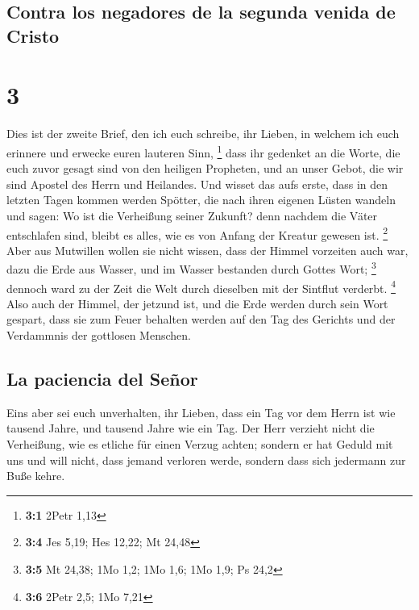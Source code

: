 \hypertarget{contra-los-negadores-de-la-segunda-venida-de-cristo}{%
\subsection{Contra los negadores de la segunda venida de
Cristo}\label{contra-los-negadores-de-la-segunda-venida-de-cristo}}

\hypertarget{section-2}{%
\section{3}\label{section-2}}

 Dies ist der zweite Brief, den ich euch schreibe, ihr
Lieben, in welchem ich euch erinnere und erwecke euren lauteren Sinn,
\footnote{\textbf{3:1} 2Petr 1,13}  dass ihr gedenket an
die Worte, die euch zuvor gesagt sind von den heiligen Propheten, und an
unser Gebot, die wir sind Apostel des Herrn und Heilandes.
 Und wisset das aufs erste, dass in den letzten Tagen
kommen werden Spötter, die nach ihren eigenen Lüsten wandeln
 und sagen: Wo ist die Verheißung seiner Zukunft? denn
nachdem die Väter entschlafen sind, bleibt es alles, wie es von Anfang
der Kreatur gewesen ist. \footnote{\textbf{3:4} Jes 5,19; Hes 12,22; Mt
  24,48}  Aber aus Mutwillen wollen sie nicht wissen, dass
der Himmel vorzeiten auch war, dazu die Erde aus Wasser, und im Wasser
bestanden durch Gottes Wort; \footnote{\textbf{3:5} Mt 24,38; 1Mo 1,2;
  1Mo 1,6; 1Mo 1,9; Ps 24,2}  dennoch ward zu der Zeit die
Welt durch dieselben mit der Sintflut verderbt. \footnote{\textbf{3:6}
  2Petr 2,5; 1Mo 7,21}  Also auch der Himmel, der jetzund
ist, und die Erde werden durch sein Wort gespart, dass sie zum Feuer
behalten werden auf den Tag des Gerichts und der Verdammnis der
gottlosen Menschen.

\hypertarget{la-paciencia-del-seuxf1or}{%
\subsection{La paciencia del Señor}\label{la-paciencia-del-seuxf1or}}

 Eins aber sei euch unverhalten, ihr Lieben, dass ein Tag
vor dem Herrn ist wie tausend Jahre, und tausend Jahre wie ein Tag.
 Der Herr verzieht nicht die Verheißung, wie es etliche
für einen Verzug achten; sondern er hat Geduld mit uns und will nicht,
dass jemand verloren werde, sondern dass sich jedermann zur Buße kehre.

